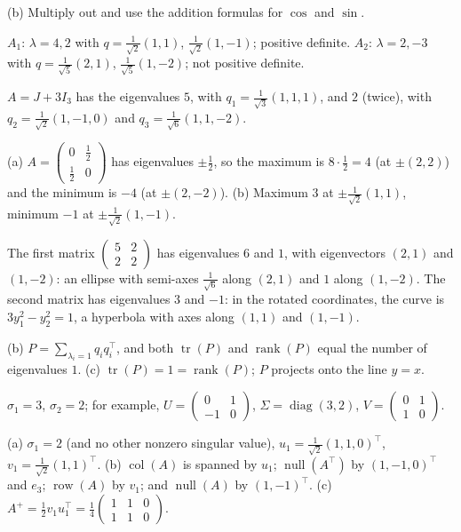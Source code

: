 \documentclass[11pt]{article}
\theoremstyle{definition}
\DeclareMathOperator{\rank}{rank}
\DeclareMathOperator{\Null}{null}
\DeclareMathOperator{\col}{col}
\DeclareMathOperator{\row}{row}
\DeclareMathOperator{\tr}{tr}
\DeclareMathOperator{\diag}{diag}
\begin{document}
\begin{description}[leftmargin=0pt, itemsep=0.3em]
    \item[\ref{pr:reflections}.] (b) Multiply out and use the addition formulas for $\cos$ and $\sin$.
    \item[\ref{pr:spectral-2}.] $A_1$: $\lambda = 4, 2$ with $q = \frac{1}{\sqrt{2}}(1, 1)$, $\frac{1}{\sqrt{2}}(1, -1)$; positive definite. $A_2$: $\lambda = 2, -3$ with $q = \frac{1}{\sqrt{5}}(2, 1)$, $\frac{1}{\sqrt{5}}(1, -2)$; not positive definite.
    \item[\ref{pr:spectral-3}.] $A = J + 3I_3$ has the eigenvalues $5$, with $q_1 = \frac{1}{\sqrt{3}}(1, 1, 1)$, and $2$ (twice), with $q_2 = \frac{1}{\sqrt{2}}(1, -1, 0)$ and $q_3 = \frac{1}{\sqrt{6}}(1, 1, -2)$.
    \item[\ref{pr:rayleigh}.] (a) $A = \begin{pmatrix} 0 & \frac{1}{2} \\ \frac{1}{2} & 0 \end{pmatrix}$ has eigenvalues $\pm\frac{1}{2}$, so the maximum is $8 \cdot \frac{1}{2} = 4$ (at $\pm(2, 2)$) and the minimum is $-4$ (at $\pm(2, -2)$). (b) Maximum $3$ at $\pm\frac{1}{\sqrt{2}}(1, 1)$, minimum $-1$ at $\pm\frac{1}{\sqrt{2}}(1, -1)$.
    \item[\ref{pr:quadric}.] The first matrix $\begin{pmatrix} 5 & 2 \\ 2 & 2 \end{pmatrix}$ has eigenvalues $6$ and $1$, with eigenvectors $(2, 1)$ and $(1, -2)$: an ellipse with semi-axes $\frac{1}{\sqrt{6}}$ along $(2, 1)$ and $1$ along $(1, -2)$. The second matrix has eigenvalues $3$ and $-1$: in the rotated coordinates, the curve is $3y_1^2 - y_2^2 = 1$, a hyperbola with axes along $(1, 1)$ and $(1, -1)$.
    \item[\ref{pr:sym-idempotent}.] (b) $P = \sum_{\lambda_i = 1} q_i q_i^\top$, and both $\tr(P)$ and $\rank(P)$ equal the number of eigenvalues $1$. (c) $\tr(P) = 1 = \rank(P)$; $P$ projects onto the line $y = x$.
    \item[\ref{pr:svd-diag}.] $\sigma_1 = 3$, $\sigma_2 = 2$; for example, $U = \begin{pmatrix} 0 & 1 \\ -1 & 0 \end{pmatrix}$, $\Sigma = \diag(3, 2)$, $V = \begin{pmatrix} 0 & 1 \\ 1 & 0 \end{pmatrix}$.
    \item[\ref{pr:svd-rank1}.] (a) $\sigma_1 = 2$ (and no other nonzero singular value), $u_1 = \frac{1}{\sqrt{2}}(1, 1, 0)^\top$, $v_1 = \frac{1}{\sqrt{2}}(1, 1)^\top$. (b) $\col(A)$ is spanned by $u_1$; $\Null(A^\top)$ by $(1, -1, 0)^\top$ and $e_3$; $\row(A)$ by $v_1$; and $\Null(A)$ by $(1, -1)^\top$. (c) $A^+ = \frac{1}{2} v_1 u_1^\top = \frac{1}{4}\begin{pmatrix} 1 & 1 & 0 \\ 1 & 1 & 0 \end{pmatrix}$.

\end{description}
\end{document}

